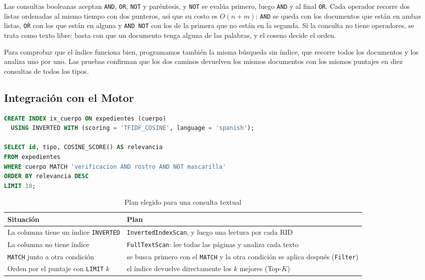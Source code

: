 \documentclass[a4paper,12pt]{article}
\begin{document}
Las consultas booleanas aceptan \texttt{AND}, \texttt{OR}, \texttt{NOT} y
paréntesis, y \texttt{NOT} se evalúa primero, luego \texttt{AND} y al final
\texttt{OR}. Cada operador recorre dos listas ordenadas al mismo tiempo con dos
punteros, así que su costo es $O(n + m)$: \texttt{AND} se queda con los
documentos que están en ambas listas, \texttt{OR} con los que están en alguna y
\texttt{AND NOT} con los de la primera que no están en la segunda. Si la
consulta no tiene operadores, se trata como texto libre: basta con que un
documento tenga alguna de las palabras, y el coseno decide el orden.

Para comprobar que el índice funciona bien, programamos también la misma
búsqueda sin índice, que recorre todos los documentos y los analiza uno por
uno. Las pruebas confirman que los dos caminos devuelven los mismos documentos
con los mismos puntajes en diez consultas de todos los tipos.

\subsection{Integración con el Motor}

\begin{lstlisting}[language=SQL, caption={Índice invertido y consulta textual}]
CREATE INDEX ix_cuerpo ON expedientes (cuerpo)
  USING INVERTED WITH (scoring = 'TFIDF_COSINE', language = 'spanish');

SELECT id, tipo, COSINE_SCORE() AS relevancia
FROM expedientes
WHERE cuerpo MATCH 'verificacion AND rostro AND NOT mascarilla'
ORDER BY relevancia DESC
LIMIT 10;
\end{lstlisting}

\begin{table}[H]
\centering
\caption{Plan elegido para una consulta textual}
\begin{tabularx}{\textwidth}{@{}lX@{}}
\toprule
\textbf{Situación} & \textbf{Plan} \\
\midrule
La columna tiene un índice \texttt{INVERTED} & \texttt{InvertedIndexScan}, y luego una lectura por cada RID \\
La columna no tiene índice & \texttt{FullTextScan}: lee todas las páginas y analiza cada texto \\
\texttt{MATCH} junto a otra condición & se busca primero con el \texttt{MATCH} y la otra condición se aplica después (\texttt{Filter}) \\
Orden por el puntaje con \texttt{LIMIT} $k$ & el índice devuelve directamente los $k$ mejores (Top-$K$) \\
\bottomrule
\end{tabularx}
\end{table}
\end{document}

